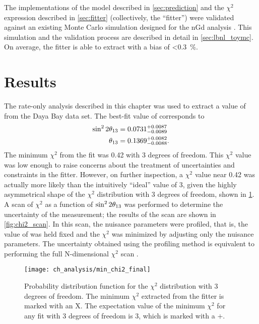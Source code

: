 The implementations of the model described in \cref{sec:prediction}
and the $\chi^2$ expression described in \cref{sec:fitter}
(collectively, the ``fitter'')
were validated against an existing Monte Carlo simulation
designed for the nGd analysis \cite{lbnl_toymc}.
This simulation and the validation process are  described in detail in \cref{sec:lbnl_toymc}.
On average, the fitter is able to extract \thetaot{}
with a bias of \SI{<0.3}{\percent}.

\section{Results}
\label{sec:results}

The rate-only analysis described in this chapter
was used to extract a value of \thetaot{}
from the Daya Bay data set.
The best-fit value of \thetaot{} corresponds to
\begin{align}\label{eq:result}
    \begin{split}
        \sin^22\theta_{13} &= 0.0731^{+0.0087}_{-0.0089}\\
        \theta_{13} &= 0.1369^{+0.0082}_{-0.0088}.
    \end{split}
\end{align}
The minimum $\chi^2$ from the fit was 0.42 with 3 degrees of freedom.
This $\chi^2$ value was low enough to raise concerns
about the treatment of uncertainties and constraints in the fitter.
However, on further inspection, a $\chi^2$ value near 0.42
was actually more likely than the intuitively ``ideal'' value of 3,
given the highly asymmetrical shape
of the $\chi^2$ distribution with 3 degrees of freedom,
shown in \cref{fig:chi2_pdf}.
A scan of $\chi^2$ as a function of $\sin^22\theta_{13}$
was performed to determine the uncertainty of the measurement;
the results of the scan are shown in \cref{fig:chi2_scan}.
In this scan, the nuisance parameters were profiled,
that is, the value of \thetaot{} was held fixed
and the $\chi^2$ was minimized by adjusting only the nuisance parameters.
The uncertainty obtained using the profiling method
is equivalent to performing the full N-dimensional $\chi^2$ scan \cite{pdg}.

\begin{figure}
    \centering
    \texttt{[image: ch\_analysis/min\_chi2\_final]}
    \caption{
        Probability distribution function for the $\chi^2$ distribution
        with 3 degrees of freedom.
        The minimum $\chi^2$ extracted from the fitter
        is marked with an X.
        The expectation value of the minimum $\chi^2$
        for any fit with 3 degrees of freedom is 3,
        which is marked with a $+$.
    }
    \label{fig:chi2_pdf}
\end{figure}

